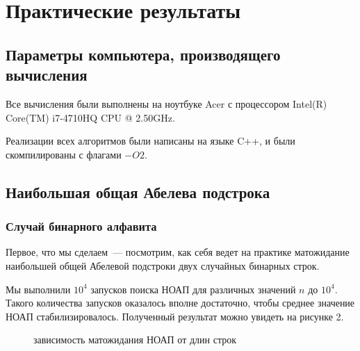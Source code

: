 \chapter{Практические результаты}
\section{Параметры компьютера, производящего вычисления}
Все вычисления были выполнены на ноутбуке Acer с процессором Intel(R) Core(TM) i7-4710HQ CPU @ 2.50GHz.

Реализации всех алгоритмов были написаны на языке C++, и были скомпилированы с флагами $-O2$.

\section{Наибольшая общая Абелева подстрока}
\subsection{Случай бинарного алфавита}

Первое, что мы сделаем~--- посмотрим, как себя ведет на практике матожидание наибольшей общей Абелевой подстроки двух случайных бинарных строк. 

Мы выполнили $10^4$ запусков поиска НОАП для различных значений $n$ до $10^4$. Такого количества запусков оказалось вполне достаточно, чтобы среднее значение НОАП стабилизировалось. Полученный результат можно увидеть на рисунке 2.

\begin{figure}[h]
\caption{зависимость матожидания НОАП от длин строк}
\end{figure}

